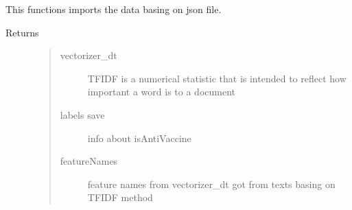 \documentclass[letterpaper,10pt,english]{sphinxmanual}
\begin{document}
\begin{fulllineitems}
\label{\detokenize{func:func.get_data}}
\pysigstartsignatures
{}
\pysigstopsignatures
\sphinxAtStartPar
This functions imports the data basing on json file.
\begin{description}
\item[{Returns}] \leavevmode\begin{quote}\begin{description}
\item[{vectorizer\_dt}] \leavevmode
\sphinxAtStartPar
TF\sphinxhyphen{}IDF is a numerical statistic that is intended to reflect how important a word is to a document

\item[{labels save}] \leavevmode
\sphinxAtStartPar
info about isAntiVaccine

\item[{featureNames}] \leavevmode
\sphinxAtStartPar
feature names from vectorizer\_dt got from texts basing on TF\sphinxhyphen{}IDF method

\end{description}\end{quote}

\end{description}

\end{fulllineitems}

\end{document}

